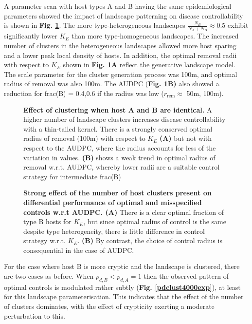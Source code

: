 \documentclass[11pt,letterpaper]{article}
\begin{document}
{A parameter scan with host types A and B having the same epidemiological parameters showed the impact of landscape patterning on disease controllability is shown in \textbf{Fig. \ref{identicaltypes}}. The more type-heterogeneous landscapes $\frac{N_{B}}{N_{A} + N_{B}} \approx 0.5$ exhibit significantly lower $K_E$ than  more type-homogeneous landscapes.  The increased number of clusters in the heterogeneous landscapes allowed more host sparing and a lower peak local density of hosts. In addition, the optimal removal radii with respect to $K_E$ shown in \textbf{Fig.  \ref{identicaltypes}A} reflect the generative landscape model. The scale parameter for the cluster generation process was 100m, and optimal radius of removal was also 100m. The AUDPC (\textbf{Fig.  \ref{identicaltypes}B)} also showed a reduction for frac(B)  = 0.4,0.6 if the radius was low ($r _{\mathrm{rem}} \approx$ 50m, 100m).


\begin{figure}[h]
	\centering

\caption{ \label{identicaltypes} \textbf{Effect of clustering when host A and B are identical.} A higher number of landscape clusters increases disease controllability with a thin-tailed kernel. There is a strongly conserved optimal radius of removal (100m) with respect to $K_E$ \textbf{(A)} but not with respect to the AUDPC, where the radius accounts for less of the variation in values. \textbf{(B)} shows a weak trend in optimal radius of removal w.r.t. AUDPC, whereby lower radii are a suitable control strategy for intermediate frac(B)}
\end{figure}

\begin{figure}[h] %
	\centering

\caption{ \label{compareidenticaltypes} \textbf{Strong effect of the number of host clusters present on differential performance of optimal and misspecified controls w.r.t AUDPC. (A)} There is a clear optimal fraction of type B hosts for $K_E$, but since optimal radius of control is the same despite type heterogeneity, there is little difference in control strategy w.r.t. $K_E$. \textbf{(B)} By contrast, the choice of control radius is consequential in the case of AUDPC.}
\end{figure}

For the case where host B is more cryptic and the landscape is clustered, there are two cases as before. When $p_{d, B} < p_{d,A} = 1$ then the observed pattern of optimal controls is modulated rather subtly (\textbf{Fig. \ref{pdclust4000exp}}), at least for this landscape parameterisation. This indicates that the effect of  the number of clusters dominates, with the effect of crypticity exerting a moderate perturbation to this. 

}
\end{document}
